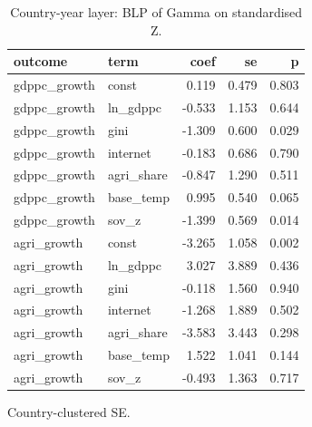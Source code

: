 \begin{table}[htbp]
\centering
\caption{Country-year layer: BLP of Gamma on standardised Z.}
\label{tab:layer1blp}
\begin{tabular}{llrrr}
\toprule
outcome & term & coef & se & p \\
\midrule
gdppc\_growth & const & 0.119 & 0.479 & 0.803 \\
gdppc\_growth & ln\_gdppc & -0.533 & 1.153 & 0.644 \\
gdppc\_growth & gini & -1.309 & 0.600 & 0.029 \\
gdppc\_growth & internet & -0.183 & 0.686 & 0.790 \\
gdppc\_growth & agri\_share & -0.847 & 1.290 & 0.511 \\
gdppc\_growth & base\_temp & 0.995 & 0.540 & 0.065 \\
gdppc\_growth & sov\_z & -1.399 & 0.569 & 0.014 \\
agri\_growth & const & -3.265 & 1.058 & 0.002 \\
agri\_growth & ln\_gdppc & 3.027 & 3.889 & 0.436 \\
agri\_growth & gini & -0.118 & 1.560 & 0.940 \\
agri\_growth & internet & -1.268 & 1.889 & 0.502 \\
agri\_growth & agri\_share & -3.583 & 3.443 & 0.298 \\
agri\_growth & base\_temp & 1.522 & 1.041 & 0.144 \\
agri\_growth & sov\_z & -0.493 & 1.363 & 0.717 \\
\bottomrule
\end{tabular}
\par\smallskip\footnotesize Country-clustered SE.
\end{table}
